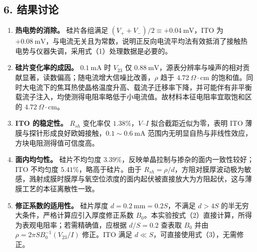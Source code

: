 \documentclass[12pt,a4paper]{ctexart}
\begin{document}
\subsection*{6. 结果讨论}
\begin{enumerate}
    \item \textbf{热电势的消除。} 硅片各组满足 $(V_{+}+V_{-})/2\equiv +0.04\ \mathrm{mV}$，ITO 为 $+0.08\ \mathrm{mV}$，与电流无关且为常数，说明正反向电流平均法有效抵消了接触热电势与仪器失调，采用式（1）处理数据是必要的。
    \item \textbf{硅片变化率的成因。} $0.1\ \mathrm{mA}$ 时 $V_{23}$ 仅 $0.88\ \mathrm{mV}$，源表分辨率与噪声的相对贡献显著，读数偏高；随电流增大信噪比改善，$\rho$ 趋于 $4.72\ \Omega\!\cdot\!\mathrm{cm}$ 的饱和值。同时大电流下的焦耳热使晶格温度升高、载流子迁移率下降，并可能伴有非平衡载流子注入，均使测得电阻率略低于小电流值。故材料本征电阻率宜取饱和区的 $4.72\ \Omega\!\cdot\!\mathrm{cm}$。
    \item \textbf{ITO 的稳定性。} $R_{sh}$ 变化率仅 $1.38\%$，$V$–$I$ 拟合截距近似为零，表明 ITO 薄膜与探针形成良好欧姆接触，$0.1\sim0.6\ \mathrm{mA}$ 范围内无明显自热与非线性效应，方块电阻测得值可信度高。
    \item \textbf{面内均匀性。} 硅片不均匀度 $3.39\%$，反映单晶拉制与掺杂的面内一致性较好；ITO 不均匀度 $5.41\%$，略高于硅片。由于 $R_{sh}=\rho/d$，方阻对膜厚波动极为敏感，溅射成膜时膜厚与氧空位浓度的面内起伏被直接放大为方阻起伏，这与薄膜工艺的本征离散性一致。
    \item \textbf{修正系数的适用性。} 硅片厚度 $d=0.2\ \mathrm{mm}=0.2S$，不满足 $d>4S$ 的半无穷大条件，严格计算应引入厚度修正系数 $B_0$。本实验按式（2）直接计算，所得为表观电阻率；若需精确值，应根据 $d/S=0.2$ 查表取 $B_0$ 并由 $\rho=2\pi S B_0^{-1}(V_{23}/I)$ 修正。ITO 满足 $d\ll S$，可直接使用式（3），无需修正。
\end{enumerate}
\end{document}
